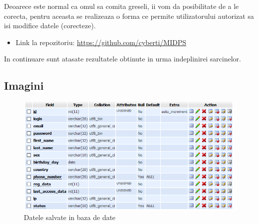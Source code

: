 Deoarece este normal ca omul sa comita greseli, ii vom da posibilitate de a le corecta, pentru aceasta se realizeaza o forma ce permite utilizatorului autorizat sa isi modifice datele (corecteze).  

\begin{itemize}
	\item[]
	\begin{center}
		Link la repozitoriu: \url{https://github.com/cyberti/MIDPS}
	\end{center}
\end{itemize}

In continuare sunt atasate rezultatele obtinute in urma indeplinirei sarcinelor.

\newpage
\subsection{Imagini}
\begin{figure}[htb]
	\begin{center}
		\centering
		\includegraphics[scale = 0.9]{img/user_tabel}
		\caption{Datele salvate in baza de date}%
		\label{fig:usertabel}
	\end{center}
\end{figure}

